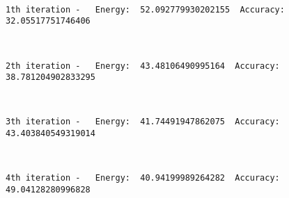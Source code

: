 \documentclass[11pt]{article}
\begin{document}
    \begin{center}
    \end{center}
    { \hspace*{\fill} \\}
    
    \begin{Verbatim}[commandchars=\\\{\}]
1th iteration -   Energy:  52.092779930202155  Accuracy:  32.05517751746406

    \end{Verbatim}

    \begin{center}
    \end{center}
    { \hspace*{\fill} \\}
    
    \begin{Verbatim}[commandchars=\\\{\}]
2th iteration -   Energy:  43.48106490995164  Accuracy:  38.781204902833295

    \end{Verbatim}

    \begin{center}
    \end{center}
    { \hspace*{\fill} \\}
    
    \begin{Verbatim}[commandchars=\\\{\}]
3th iteration -   Energy:  41.74491947862075  Accuracy:  43.403840549319014

    \end{Verbatim}

    \begin{center}
    \end{center}
    { \hspace*{\fill} \\}
    
    \begin{Verbatim}[commandchars=\\\{\}]
4th iteration -   Energy:  40.94199989264282  Accuracy:  49.04128280996828

    \end{Verbatim}
\end{document}
